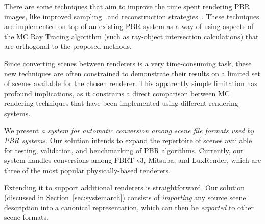 There are some techniques that aim to improve the time spent rendering PBR images, like improved sampling~\cite{Heck2013, Pilleboue:2015} and reconstruction strategies~\cite{Sen2012, Rousselle2013, Kalantari2015, Bitterli2016}. These techniques are implemented on top of an existing PBR system as a way of using aspects of the MC Ray Tracing algorithm (such as ray-object intersection calculations) that are orthogonal to the proposed methods.

Since converting scenes between renderers is a very time-consuming task, these new techniques are often constrained to demonstrate their results on a limited set of scenes available for the chosen renderer. This apparently simple limitation has profound implications, as it constrains a direct comparison between MC rendering techniques that have been implemented using different rendering systems.


We present {\it a system for automatic conversion among scene file formats used by PBR systems}. Our solution intends to expand the repertoire of scenes available for testing, validation, and benchmarking of PBR algorithms. Currently, our system handles conversions among PBRT v3, Mitsuba, and LuxRender, which are three of the most popular physically-based renderers. 

Extending it to support additional renderers is straightforward. Our solution (discussed in Section~\ref{sec:systemarch}) consists of {\it importing} any source scene description into a canonical representation, which can then be {\it exported} to 
other scene formats. 

